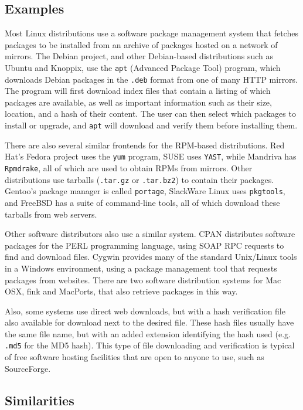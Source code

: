 \documentclass[conference]{IEEEtran}
\begin{document}
\subsection{Examples}
\label{examples}

Most Linux distributions use a software package management system
that fetches packages to be installed from an archive of packages
hosted on a network of mirrors. The Debian project, and other
Debian-based distributions such as Ubuntu and Knoppix, use the
\texttt{apt} (Advanced Package Tool) program, which downloads Debian
packages in the \texttt{.deb} format from one of many HTTP mirrors.
The program will first download index files that contain a listing
of which packages are available, as well as important information
such as their size, location, and a hash of their content. The user
can then select which packages to install or upgrade, and
\texttt{apt} will download and verify them before installing them.

There are also several similar frontends for the RPM-based
distributions. Red Hat's Fedora project uses the \texttt{yum}
program, SUSE uses \texttt{YAST}, while Mandriva has
\texttt{Rpmdrake}, all of which are used to obtain RPMs from
mirrors. Other distributions use tarballs (\texttt{.tar.gz} or
\texttt{.tar.bz2}) to contain their packages. Gentoo's package
manager is called \texttt{portage}, SlackWare Linux uses
\texttt{pkgtools}, and FreeBSD has a suite of command-line tools,
all of which download these tarballs from web servers.

Other software distributors also use a similar system. CPAN
distributes software packages for the PERL
programming language, using SOAP RPC requests to find and download
files. Cygwin provides many of the
standard Unix/Linux tools in a Windows environment, using a
package management tool that requests packages from websites. There
are two software distribution systems for Mac OSX, fink and
MacPorts, that also retrieve packages in this way.

Also, some systems use direct web downloads, but with a hash
verification file also available for download next to the desired
file. These hash files usually have the same file name, but with an
added extension identifying the hash used (e.g. \texttt{.md5} for
the MD5 hash). This type of file downloading and verification is
typical of free software hosting facilities that are open to anyone
to use, such as SourceForge.

\subsection{Similarities}
\label{similarities}
\end{document}
